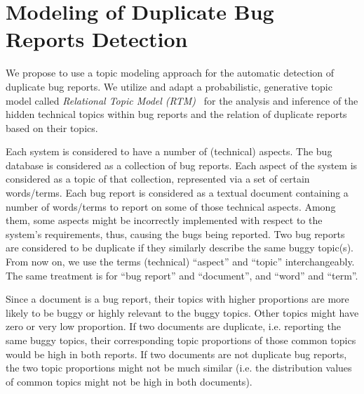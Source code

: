 \section{Modeling of Duplicate Bug Reports Detection}
\label{formulation}


We propose to use a topic modeling approach for the automatic
detection of duplicate bug reports. We utilize and adapt a
probabilistic, generative topic model called {\em Relational Topic
  Model (RTM)}~\cite{RTM} for the analysis and inference of the hidden
technical topics within bug reports and the relation of duplicate
reports based on their topics.

Each system is considered to have a number of (technical)
aspects. The bug database is considered as a collection of bug
reports. Each aspect of the system is considered as a topic of that
collection, represented via a set of certain words/terms. Each bug
report is considered as a textual document containing a number of
words/terms to report on some of those technical aspects. Among them,
some aspects might be incorrectly implemented with respect to the
system's requirements, thus, causing the bugs being reported. Two bug
reports are considered to be duplicate if they similarly describe the
same buggy topic(s). From now on, we use the terms (technical)
``aspect'' and ``topic'' interchangeably. The same treatment is for
``bug report'' and ``document'', and ``word'' and ``term''.

Since a document is a bug report, their topics with higher proportions
are more likely to be buggy or highly relevant to the buggy
topics. Other topics might have zero or very low proportion. If two
documents are duplicate, i.e. reporting the same buggy topics, their
corresponding topic proportions of those common topics would be high
in both reports. If two documents are not duplicate bug reports, the
two topic proportions might not be much similar (i.e. the distribution
values of common topics might not be high in both documents).

